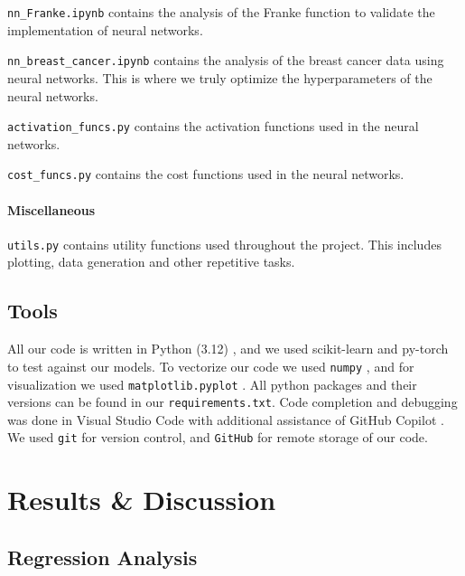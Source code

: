 \documentclass[aps,pra,english,notitlepage,reprint,nofootinbib]{revtex4-1}  %
\begin{document}
\verb|nn_Franke.ipynb| contains the analysis of the Franke function to validate the implementation of neural networks.

\verb|nn_breast_cancer.ipynb| contains the analysis of the breast cancer data using neural networks. This is where we truly optimize the hyperparameters of the neural networks.

\verb|activation_funcs.py| contains the activation functions used in the neural networks.

\verb|cost_funcs.py| contains the cost functions used in the neural networks.

\paragraph*{Miscellaneous}
\verb|utils.py| contains utility functions used throughout the project. This includes plotting, data generation and other repetitive tasks.

\subsection{Tools}\label{subsec:tools}

All our code is written in Python (3.12) \cite{Python}, and we used scikit-learn \cite{scikit-learn} and py-torch to test against our models. To vectorize our code we used \verb|numpy| \cite{Numpy}, and for visualization we used \verb|matplotlib.pyplot| \cite{Matplotlib}. All python packages and their versions can be found in our \verb|requirements.txt|. Code completion and debugging was done in Visual Studio Code \cite{VSCode} with additional assistance of GitHub Copilot \cite{Copilot}. We used \verb|git| \cite{Git} for version control, and \verb|GitHub| \cite{GitHub} for remote storage of our code.

\section{Results \& Discussion}\label{sec:results discussion}
\subsection{Regression Analysis}
\end{document}
